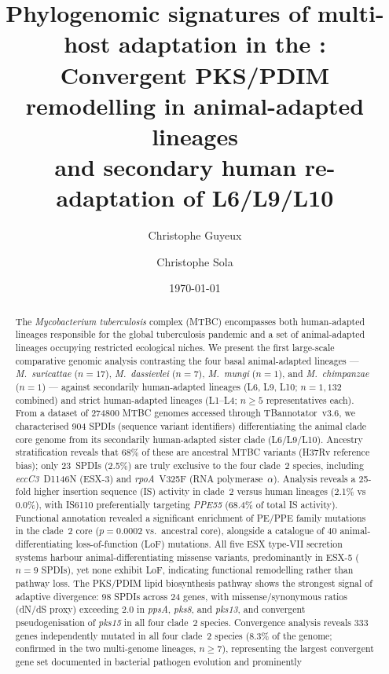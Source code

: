 \documentclass[11pt,a4paper]{article}
\title{Phylogenomic signatures of multi-host adaptation in the \MTBC:\\
Convergent PKS/PDIM remodelling in animal-adapted lineages\\
and secondary human re-adaptation of L6/L9/L10}
\author[1]{Christophe Guyeux}
\author[2]{Christophe Sola}
\affil[1]{FEMTO-ST Institute, Univ.\ Bourgogne Franche-Comté, CNRS, Supmicrotech,
          Belfort, France}
\affil[2]{Institute for Integrative Biology of the Cell (I2BC), Université Paris-Saclay,
          CEA, CNRS, Gif-sur-Yvette, France}
\date{\today}
\newcommand{\MTBCfull}{\textit{Mycobacterium tuberculosis} complex (MTBC)}
\newcommand{\Msur}{\textit{M.~suricattae}}
\newcommand{\Mmun}{\textit{M.~mungi}}
\newcommand{\Mchi}{\textit{M.~chimpanzae}}
\begin{document}
\maketitle

\begin{abstract}
The \MTBCfull{} encompasses both human-adapted lineages responsible for the global
tuberculosis pandemic and a set of animal-adapted lineages occupying restricted
ecological niches.
%
We present the first large-scale comparative genomic analysis contrasting the four
basal animal-adapted lineages --- \Msur{} ($n = 17$), \textit{M.~dassievlei} ($n = 7$),
\Mmun{} ($n = 1$), and \Mchi{} ($n = 1$) --- against secondarily human-adapted lineages
(L6, L9, L10; $n = 1{,}132$ combined) and strict human-adapted lineages
(L1--L4; $n \geq 5$ representatives each).
%
From a dataset of \num{274800} MTBC genomes accessed through TBannotator~v3.6,
we characterised 904 SPDIs (sequence variant identifiers) differentiating the animal
clade core genome from its secondarily human-adapted sister clade (L6/L9/L10).
Ancestry stratification reveals that 68\% of these are ancestral MTBC variants
(H37Rv reference bias); only 23~SPDIs (2.5\%) are truly exclusive to
the four clade~2 species, including \textit{eccC3}~D1146N (ESX-3) and
\textit{rpoA}~V325F (RNA polymerase~$\alpha$).
%
Analysis reveals a 25-fold higher insertion sequence (IS) activity in clade~2
versus human lineages (2.1\% vs 0.0\%), with IS6110 preferentially targeting
\textit{PPE55} (68.4\% of total IS activity). Functional annotation revealed a significant enrichment of PE/PPE family mutations
in the clade~2 core ($p = 0.0002$ vs.\ ancestral core), alongside a catalogue of
40 animal-differentiating loss-of-function (LoF) mutations.
%
All five ESX type-VII secretion systems harbour animal-differentiating missense variants,
predominantly in ESX-5 ($n = 9$ SPDIs), yet none exhibit LoF, indicating
functional remodelling rather than pathway loss.
%
The PKS/PDIM lipid biosynthesis pathway shows the strongest signal of adaptive
divergence: 98 SPDIs across 24 genes, with missense/synonymous ratios
(dN/dS proxy) exceeding 2.0 in \textit{ppsA}, \textit{pks8}, and
\textit{pks13}, and convergent pseudogenisation of
\textit{pks15} in all four clade~2 species.
%
Convergence analysis reveals 333 genes independently mutated in all four clade~2
species (8.3\% of the genome; confirmed in the two multi-genome lineages, $n \geq 7$), representing the
largest convergent gene set documented in bacterial pathogen evolution and prominently

\end{abstract}
\end{document}
